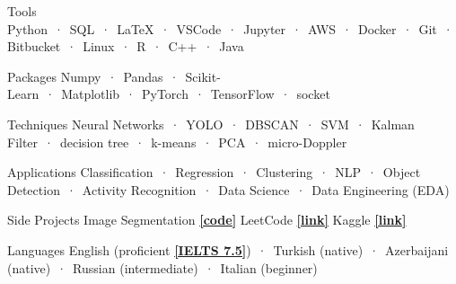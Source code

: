 

\begin{cvskills}

  \cvskill
    {Tools} %
    {Python~·~SQL~·~LaTeX~·~VSCode~·~Jupyter~·~AWS~·~Docker~·~Git~·~Bitbucket~·~Linux~·~R~·~C++~·~Java} %

  \cvskill
    {Packages} %
    {Numpy~·~Pandas~·~Scikit-Learn~·~Matplotlib~·~PyTorch~·~TensorFlow~·~socket} %

  \cvskill
    {Techniques} %
    {Neural Networks~·~YOLO~·~DBSCAN~·~SVM~·~Kalman Filter~·~decision tree~·~k-means~·~PCA~·~micro-Doppler} %
    
  \cvskill
    {Applications} %
    {Classification~·~Regression~·~Clustering~·~NLP~·~Object Detection~·~Activity Recognition~·~Data Science~·~Data Engineering (EDA)} %
    

  \cvskill
    {Side Projects} %
    {Image Segmentation \href{https://github.com/enverbashirov/Image-Segmentation-Superpixels}{\textbf{[code]}} LeetCode \href{https://leetcode.com/enverbashirov/}{\textbf{[link]}} Kaggle \href{https://www.kaggle.com/enverbashirov}{\textbf{[link]}}} %

  \hline
  
  \cvskill
    {Languages} %
    {English (proficient \href{https://github.com/enverbashirov/Resume-Enver-Bashirov/blob/main/certificates/ielts_2016.pdf}{\textbf{[IELTS 7.5]}})~·~Turkish (native)~·~Azerbaijani (native)~·~Russian (intermediate)~·~Italian (beginner)} %




\end{cvskills}

